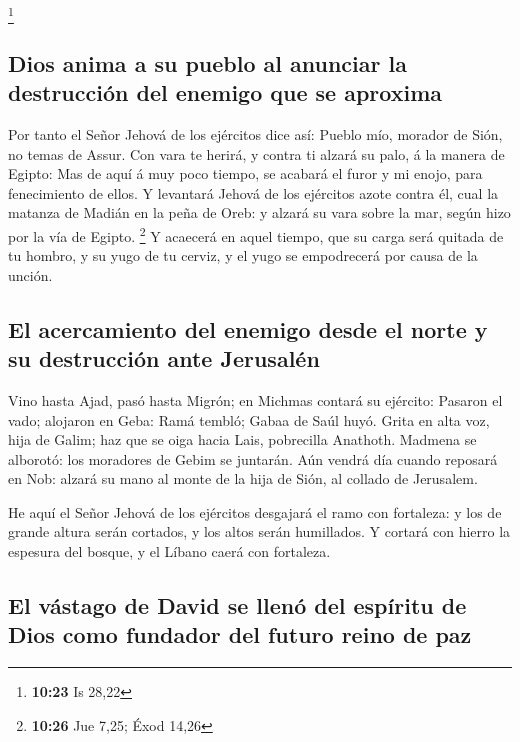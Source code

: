 \footnote{\textbf{10:23} Is 28,22}

\hypertarget{dios-anima-a-su-pueblo-al-anunciar-la-destrucciuxf3n-del-enemigo-que-se-aproxima}{%
\subsection{Dios anima a su pueblo al anunciar la destrucción del
enemigo que se
aproxima}\label{dios-anima-a-su-pueblo-al-anunciar-la-destrucciuxf3n-del-enemigo-que-se-aproxima}}

 Por tanto el Señor Jehová de los ejércitos dice así:
Pueblo mío, morador de Sión, no temas de Assur. Con vara te herirá, y
contra ti alzará su palo, á la manera de Egipto:  Mas de
aquí á muy poco tiempo, se acabará el furor y mi enojo, para
fenecimiento de ellos.  Y levantará Jehová de los
ejércitos azote contra él, cual la matanza de Madián en la peña de Oreb:
y alzará su vara sobre la mar, según hizo por la vía de Egipto.
\footnote{\textbf{10:26} Jue 7,25; Éxod 14,26}  Y
acaecerá en aquel tiempo, que su carga será quitada de tu hombro, y su
yugo de tu cerviz, y el yugo se empodrecerá por causa de la unción.

\hypertarget{el-acercamiento-del-enemigo-desde-el-norte-y-su-destrucciuxf3n-ante-jerusaluxe9n}{%
\subsection{El acercamiento del enemigo desde el norte y su destrucción
ante
Jerusalén}\label{el-acercamiento-del-enemigo-desde-el-norte-y-su-destrucciuxf3n-ante-jerusaluxe9n}}

 Vino hasta Ajad, pasó hasta Migrón; en Michmas contará
su ejército:  Pasaron el vado; alojaron en Geba: Ramá
tembló; Gabaa de Saúl huyó.  Grita en alta voz, hija de
Galim; haz que se oiga hacia Lais, pobrecilla Anathoth. 
Madmena se alborotó: los moradores de Gebim se juntarán. 
Aún vendrá día cuando reposará en Nob: alzará su mano al monte de la
hija de Sión, al collado de Jerusalem.

 He aquí el Señor Jehová de los ejércitos desgajará el
ramo con fortaleza: y los de grande altura serán cortados, y los altos
serán humillados.  Y cortará con hierro la espesura del
bosque, y el Líbano caerá con fortaleza.

\hypertarget{el-vuxe1stago-de-david-se-llenuxf3-del-espuxedritu-de-dios-como-fundador-del-futuro-reino-de-paz}{%
\subsection{El vástago de David se llenó del espíritu de Dios como
fundador del futuro reino de
paz}\label{el-vuxe1stago-de-david-se-llenuxf3-del-espuxedritu-de-dios-como-fundador-del-futuro-reino-de-paz}}

